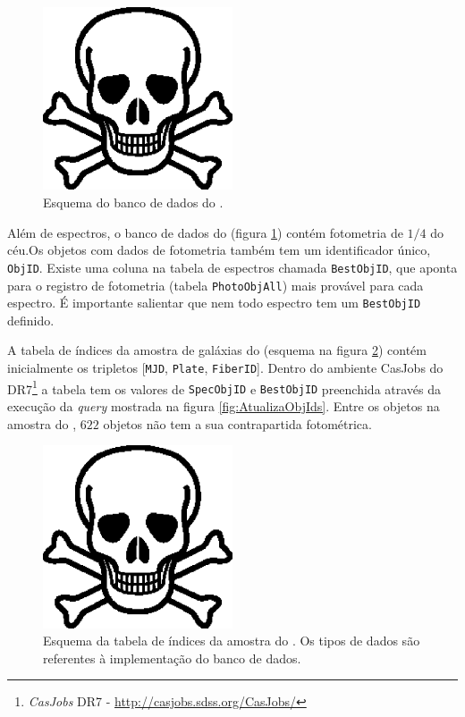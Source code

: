 \begin{figure}
	\includegraphics[width=0.5\textwidth]{figuras/test.eps}
	\caption[Esquema do banco de dados do \SDSS.]
	{Esquema do banco de dados do \SDSS.}
	\label{fig:EsquemaSDSS}
\end{figure}

Além de espectros, o banco de dados do \SDSS (figura \ref{fig:EsquemaSDSS})
contém fotometria de $1/4$ do céu.\citneed Os objetos com dados de fotometria
também tem um identificador único, {\tt ObjID}. Existe uma coluna na tabela de
espectros chamada {\tt BestObjID}, que aponta para o registro de fotometria
(tabela {\tt PhotoObjAll}) mais provável para cada espectro. É importante
salientar que nem todo espectro tem um {\tt BestObjID} definido.

A tabela de índices da amostra de galáxias do \starlight (esquema na figura
\ref{fig:TabelaAmostraStarlight}) contém inicialmente os tripletos [{\tt MJD},
{\tt Plate}, {\tt FiberID}]. Dentro do ambiente {CasJobs} do \SDSS
DR7\footnote{{\em CasJobs} \SDSS DR7 - \url{http://casjobs.sdss.org/CasJobs/}} a
tabela tem os valores de {\tt SpecObjID} e {\tt BestObjID} preenchida através da
execução da {\em query} mostrada na figura \ref{fig:AtualizaObjIds}. Entre os
objetos na amostra do \starlight, $622$ objetos não tem a sua contrapartida
fotométrica.

\begin{figure}
	\includegraphics[width=0.5\textwidth]{figuras/test.eps}
	\caption[Esquema da tabela de índices da amostra do \starlight.]
	{Esquema da tabela de índices da amostra do \starlight. Os tipos de dados são
	referentes à implementação do banco de dados.}
	\label{fig:TabelaAmostraStarlight}
\end{figure}

